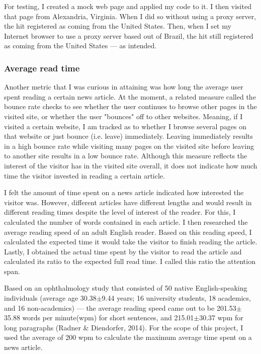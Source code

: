 \documentclass[12pt]{article}
\begin{document}
For testing, I created a mock web page and applied my code to it. I then visited that page from Alexandria, Virginia. When I did so without using a proxy server, the hit registered as coming from the United States. Then, when I set my Internet browser to use a proxy server based out of Brazil, the hit still registered as coming from the United States --- as intended.

\subsubsection{Average read time}

Another metric that I was curious in attaining was how long the average user spent reading a certain news article. At the moment, a related measure called the bounce rate checks to see whether the user continues to browse other pages in the visited site, or whether the user "bounces" off to other websites. Meaning, if I visited a certain website, I am tracked as to whether I browse several pages on that website or just bounce (i.e. leave) immediately. Leaving immediately results in a high bounce rate while visiting many pages on the visited site before leaving to another site results in a low bounce rate. 
Although this measure reflects the interest of the visitor has in the visited site overall, it does not indicate how much time the visitor invested in reading a certain article. 

I felt the amount of time spent on a news article indicated how interested the visitor was. However, different articles have different lengths and would result in different reading times despite the level of interest of the reader. For this, I calculated the number of words contained in each article. I then researched the average reading speed of an adult English reader. Based on this reading speed, I calculated the expected time it would take the visitor to finish reading the article. Lastly, I obtained the actual time spent by the visitor to read the article and calculated its ratio to the expected full read time. I called this ratio the attention span. 

Based on an ophthalmology study that consisted of 50 native English-speaking individuals (average age 30.38$\pm$9.44 years; 16 university students, 18 academics, and 16 non-academics) --- the average reading speed came out to be 201.53$\pm$35.88 words per minute(wpm) for short sentences, and 215.01$\pm$30.37 wpm for long paragraphs (Radner \& Diendorfer, 2014). For the scope of this project, I used the average of 200 wpm to calculate the maximum average time spent on a news article.  
\end{document}
